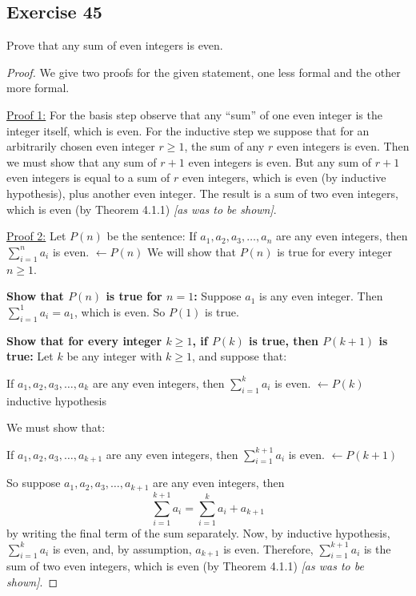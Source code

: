 \documentclass[14pt]{extarticle}
\newcommand{\from}{\leftarrow}
\newcommand{\cy}{\color{cyan}}
\begin{document}
    \subsection{Exercise 45}
    Prove that any sum of even integers is even.

    \begin{proof}
        We give two proofs for the given statement, one less formal and the other more formal.

        \underline{Proof 1:} For the basis step observe that any “sum” of one even integer is the integer itself, which is
        even. For the inductive step we suppose that for an arbitrarily chosen even integer \(r \geq 1\), the sum of
        any $r$ even integers is even. Then we must show that any sum of $r + 1$ even integers is even. But any sum of
        $r + 1$ even integers is equal to a sum of $r$ even integers, which is even (by inductive hypothesis), plus
        another even integer. The result is a sum of two even integers, which is even (by Theorem 4.1.1)
        {\it [as was to be shown]}.

        \underline{Proof 2:} Let $P(n)$ be the sentence: If \(a_1, a_2, a_3, \ldots, a_n\) are any even integers, then
        \(\sum_{i=1}^n a_i\) is even. {\cy \(\from P(n)\)} We will show that $P(n)$ is true for every integer \(n \geq 1\).

            {\bf Show that $P(n)$ is true for $n = 1$:} Suppose $a_1$ is any even integer. Then \(\sum_{i = 1}^1 a_i = a_1\),
        which is even. So $P(1)$ is true.

            {\bf Show that for every integer \(k \geq 1\), if $P(k)$ is true, then $P(k + 1)$ is true:} Let $k$ be any integer with
        \(k \geq 1\), and suppose that:

        If \(a_1, a_2, a_3, \ldots, a_k\) are any even integers, then \(\sum_{i = 1}^k a_i\) is even. {\cy \(\from P(k)\) inductive hypothesis}

        We must show that:

        If \(a_1, a_2, a_3, \ldots, a_{k+1}\) are any even integers, then \(\sum_{i = 1}^{k+1} a_i\) is even.
            {\cy \(\from P(k + 1)\)}

        So suppose \(a_1, a_2, a_3, \ldots, a_{k+1}\) are any even integers, then
        \[
            \sum_{i = 1}^{k+1} a_i = \sum_{i = 1}^k a_i + a_{k+1}
        \]
        by writing the final term of the sum separately. Now, by inductive hypothesis, \(\sum_{i = 1}^k a_i\) is even, and,
        by assumption, $a_{k+1}$ is even. Therefore, \(\sum_{i = 1}^{k+1} a_i \) is the sum of two even integers, which is
        even (by Theorem 4.1.1) {\it [as was to be shown]}.
    \end{proof}
\end{document}
